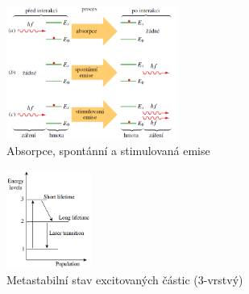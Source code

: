 \documentclass[a4paper,12pt]{article}
\begin{document}
\begin{figure}[h!]
  \centering
    \includegraphics[width=0.5\textwidth]{images/image05.png}
    \caption{Absorpce, spontánní a stimulovaná emise \cite{hrw}}
\end{figure}


\begin{figure}[h!]
  \centering
    \includegraphics[width=0.25\textwidth]{images/image01.png}
\caption{Metastabilní stav excitovaných částic (3-vrstvý) \cite{optics}}
\end{figure}
\end{document}
